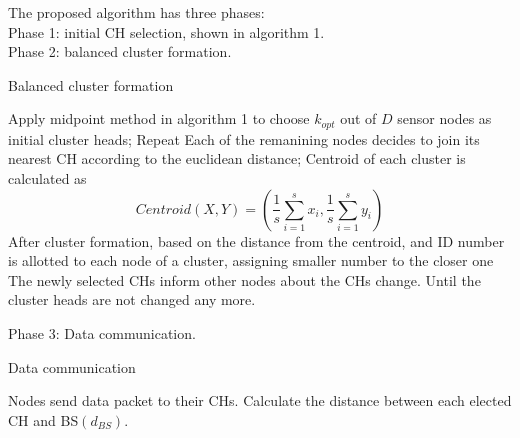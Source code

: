 \documentclass[11pt]{report}
\begin{document}
\begin{itemize}
    	\noindent The proposed algorithm has three phases:\\
    	\noindent Phase 1: initial CH selection, shown in algorithm 1.\\
    	\noindent Phase 2: balanced cluster formation.\\
    	\begin{algorithm}[H]
    		\caption{Balanced cluster formation}
    		\LinesNumbered
    		\begin{algorithmic}[1]
    			\STATE Apply midpoint method in algorithm 1 to choose $k_{opt}$ out of $D$ sensor nodes as initial cluster heads;
    			\STATE Repeat
    			\STATE Each of the remanining nodes decides to join its nearest CH according to the euclidean distance;
    			\STATE Centroid of each cluster is calculated as
    			\begin{equation*}
    			Centroid \left(X,Y\right) = \left(\frac{1}{s} \sum_{i=1}^{s}x_i, \frac{1}{s} \sum_{i=1}^{s}y_i\right)
    			\end{equation*}
    			\STATE After cluster formation, based on the distance from the centroid, and ID number is allotted to each node of a cluster, assigning smaller number to the closer one
    			\STATE {}
    			\STATE The newly selected CHs inform other nodes about the CHs change.
    			\STATE Until the cluster heads are not changed any more.
    		\end{algorithmic}
    	\end{algorithm}
    	\noindent Phase 3: Data communication. \\
    	\begin{algorithm}[H]
    		\caption{Data communication}
    		\LinesNumbered
    		\begin{algorithmic}[1]
    			\STATE Nodes send data packet to their CHs.
    			\STATE Calculate the distance  between each elected CH and BS$(d_{BS})$.
    			\STATE {}
    			
    		\end{algorithmic}
    	\end{algorithm}
    \end{itemize}
\end{document}
